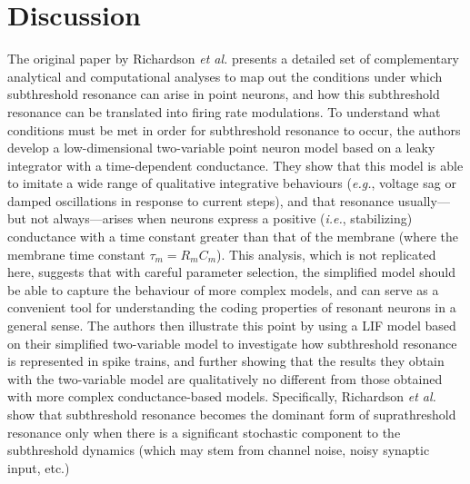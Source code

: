 \documentclass[12pt]{article}
\begin{document}
\section{Discussion}

The original paper by Richardson \textit{et al.} presents a detailed set of complementary analytical and computational analyses to map out the conditions under which subthreshold resonance can arise in point neurons, and how this subthreshold resonance can be translated into firing rate modulations.
To understand what conditions must be met in order for subthreshold resonance to occur, the authors develop a low-dimensional two-variable point neuron model based on a leaky integrator with a time-dependent conductance.
They show that this model is able to imitate a wide range of qualitative integrative behaviours (\textit{e.g.}, voltage sag or damped oscillations in response to current steps), and that resonance usually---but not always---arises when neurons express a positive (\textit{i.e.}, stabilizing) conductance with a time constant greater than that of the membrane (where the membrane time constant $\tau_m = R_m C_m$).
This analysis, which is not replicated here, suggests that with careful parameter selection, the simplified model should be able to capture the behaviour of more complex models, and can serve as a convenient tool for understanding the coding properties of resonant neurons in a general sense.
The authors then illustrate this point by using a LIF model based on their simplified two-variable model to investigate how subthreshold resonance is represented in spike trains, and further showing that the results they obtain with the two-variable model are qualitatively no different from those obtained with more complex conductance-based models.
Specifically, Richardson \textit{et al.} show that subthreshold resonance becomes the dominant form of suprathreshold resonance only when there is a significant stochastic component to the subthreshold dynamics (which may stem from channel noise, noisy synaptic input, etc.)
\end{document}
